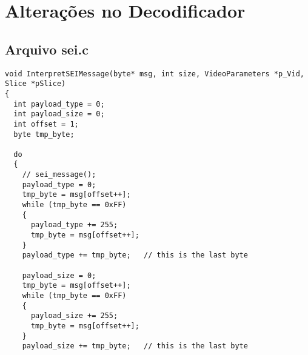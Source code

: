 \section{Alterações no Decodificador}

\subsection{Arquivo sei.c}
\begin{lstlisting}
void InterpretSEIMessage(byte* msg, int size, VideoParameters *p_Vid, Slice *pSlice)
{
  int payload_type = 0;
  int payload_size = 0;
  int offset = 1;
  byte tmp_byte;
  
  do
  {
    // sei_message();
    payload_type = 0;
    tmp_byte = msg[offset++];
    while (tmp_byte == 0xFF)
    {
      payload_type += 255;
      tmp_byte = msg[offset++];
    }
    payload_type += tmp_byte;   // this is the last byte

    payload_size = 0;
    tmp_byte = msg[offset++];
    while (tmp_byte == 0xFF)
    {
      payload_size += 255;
      tmp_byte = msg[offset++];
    }
    payload_size += tmp_byte;   // this is the last byte


\end{lstlisting}

